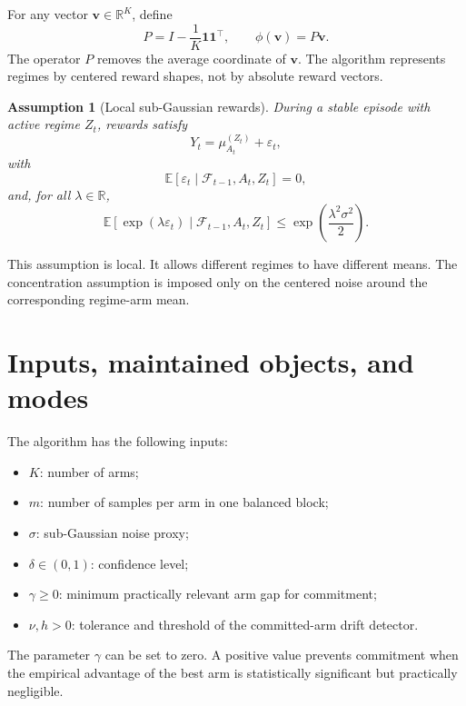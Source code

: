 \documentclass[11pt]{article}
\newtheorem{assumption}{Assumption}
\newcommand{\F}{\mathcal F}
\newcommand{\R}{\mathbb R}
\newcommand{\E}{\mathbb E}
\begin{document}
For any vector $\bm v\in\R^K$, define
\begin{equation}
    P=I-\frac{1}{K}\bm 1\bm 1^\top,
    \qquad
    \phi(\bm v)=P\bm v.
    \label{eq:centering}
\end{equation}
The operator $P$ removes the average coordinate of $\bm v$. The algorithm represents regimes by centered reward shapes, not by absolute reward vectors.

\begin{assumption}[Local sub-Gaussian rewards]
\label{ass:subgaussian}
During a stable episode with active regime $Z_t$, rewards satisfy
\begin{equation}
    Y_t=\mu_{A_t}^{(Z_t)}+\varepsilon_t,
\end{equation}
with
\begin{equation}
    \E[\varepsilon_t\mid \F_{t-1},A_t,Z_t]=0,
\end{equation}
and, for all $\lambda\in\R$,
\begin{equation}
    \E\!\left[\exp(\lambda\varepsilon_t)\mid \F_{t-1},A_t,Z_t\right]
    \leq
    \exp\!\left(\frac{\lambda^2\sigma^2}{2}\right).
    \label{eq:subgaussian}
\end{equation}
\end{assumption}

This assumption is local. It allows different regimes to have different means. The concentration assumption is imposed only on the centered noise around the corresponding regime-arm mean.

\section{Inputs, maintained objects, and modes}

The algorithm has the following inputs:
\begin{itemize}[leftmargin=1.5em]
    \item $K$: number of arms;
    \item $m$: number of samples per arm in one balanced block;
    \item $\sigma$: sub-Gaussian noise proxy;
    \item $\delta\in(0,1)$: confidence level;
    \item $\gamma\geq0$: minimum practically relevant arm gap for commitment;
    \item $\nu,h>0$: tolerance and threshold of the committed-arm drift detector.
\end{itemize}
The parameter $\gamma$ can be set to zero. A positive value prevents commitment when the empirical advantage of the best arm is statistically significant but practically negligible.
\end{document}
